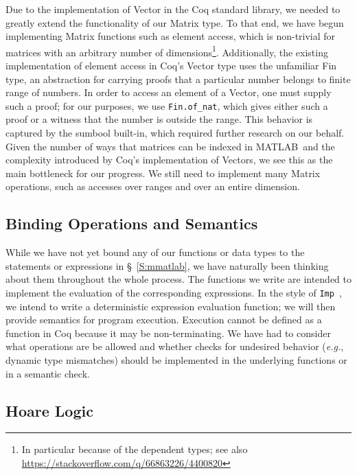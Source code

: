 \documentclass[11pt,conference]{IEEEtran}
\newcommand{\matlab}{MATLAB}
\begin{document}
Due to the implementation of \textsf{Vector} in the Coq standard library, we
needed to greatly extend the functionality of our \textsf{Matrix} type. To that
end, we have begun implementing \textsf{Matrix} functions such as element
access, which is non-trivial for matrices with an arbitrary number of
dimensions\footnote{In particular because of the dependent types; see also
\url{https://stackoverflow.com/q/66863226/4400820}}. Additionally, the existing
implementation of element access in Coq's \textsf{Vector} type uses the
unfamiliar \textsf{Fin} type, an abstraction for carrying proofs that a
particular number belongs to finite range of numbers. In order to access an
element of a \textsf{Vector}, one must supply such a proof; for our purposes, we
use \texttt{Fin.of\_nat}, which gives either such a proof or a witness that the
number is outside the range. This behavior is captured by the \textsf{sumbool}
built-in, which required further research on our behalf. Given the number of
ways that matrices can be indexed in \matlab\ and the complexity introduced by
Coq's implementation of \textsf{Vector}s, we see this as the main bottleneck for
our progress. We still need to implement many \textsf{Matrix} operations, such
as accesses over ranges and over an entire dimension.

\subsection{Binding Operations and Semantics}

While we have not yet bound any of our functions or data types to the statements
or expressions in \S~\ref{S:mmatlab}, we have naturally been thinking about them
throughout the whole process. The functions we write are intended to implement
the evaluation of the corresponding expressions. In the style of
\texttt{Imp}~\cite{Pierce:SF1}, we intend to write a deterministic expression
evaluation function; we will then provide semantics for program execution.
Execution cannot be defined as a function in Coq because it may be
non-terminating. We have had to consider what operations are be allowed and
whether checks for undesired behavior (\emph{e.g.}, dynamic type mismatches)
should be implemented in the underlying functions or in a semantic check.

\subsection{Hoare Logic}
\end{document}
